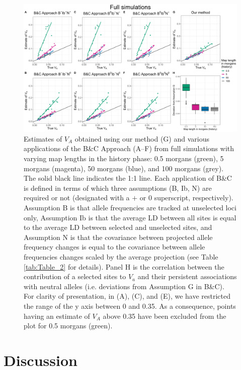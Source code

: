 \documentclass[12pt]{article}
\begin{document}
\begin{bibunit}
\begin{landscape}
\begin{figure}[H]
\begin{center}
\includegraphics[scale = 0.14]{Figures/Fig6.jpg}
\end{center}
\caption{Estimates of $V_A$ obtained using our method (G) and various applications of the B\&C Approach (A--F) from full simulations with varying map lengths in the history phase: 0.5 morgans (green), 5 morgans (magenta), 50 morgans (blue), and 100 morgans (grey). The solid black line indicates the 1:1 line. Each application of B\&C is defined in terms of which three assumptions (B, Ib, N) are required or not (designated with a $+$ or 0 superscript, respectively). Assumption B is that allele frequencies are tracked at unselected loci only, Assumption Ib is that the average LD between all sites is equal to the average LD between selected and unselected sites, and Assumption N is that the covariance between projected allele frequency changes is equal to the covariance between allele frequencies changes scaled by the average projection (see Table \ref{tab:Table_2} for details). Panel H is the correlation between the contribution of a selected sites to $V_a$ and their persistent associations with neutral alleles (i.e. deviations from Assumption G in B\&C). For clarity of presentation, in (A), (C), and (E), we have restricted the range of the y axis between 0 and 0.35. As a consequence, points having an estimate of $V_A$ above 0.35 have been excluded from the plot for 0.5 morgans (green).}
    \label{fig:Figure 6}
\end{figure}
\end{landscape}
\restoregeometry

\section*{Discussion}


\end{bibunit}
\end{document}

